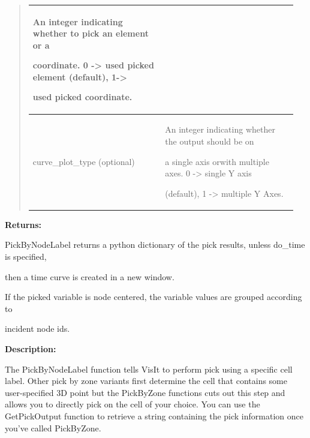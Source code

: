 \documentclass[letterpaper,10pt,english]{sphinxmanual}
\begin{document}
\begin{quote}
\begin{tabular}{|p{0.475\linewidth}|p{0.475\linewidth}|}
\begin{DUlineblock}{0em}
\item[] An integer indicating whether to pick an element or a
\item[] coordinate. 0 -\textgreater{} used picked element (default), 1-\textgreater{}
\item[] used picked coordinate.
\end{DUlineblock}
\\
\hline
curve\_plot\_type (optional)
 & 
\begin{DUlineblock}{0em}
\item[] An integer indicating whether the output should be on
\item[] a single axis orwith multiple axes. 0 -\textgreater{} single Y axis
\item[] (default), 1 -\textgreater{} multiple Y Axes.
\end{DUlineblock}
\\
\hline\end{tabular}

\end{quote}

\begin{DUlineblock}{0em}
\item[] 
\item[] \textbf{Returns:}
\item[] PickByNodeLabel returns a python dictionary of the pick results, unless do\_time is specified,
\item[] then a time curve is created in a new window.
\item[] If the picked variable is node centered, the variable values are grouped according to
\item[] incident node ids.
\item[] 
\item[] \textbf{Description:}
\item[] The PickByNodeLabel function tells VisIt to perform pick using a specific cell
label. Other pick by zone variants first determine the
cell that contains some user-specified 3D point but the PickByZone
functions cuts out this step and allows you to directly pick on the cell of
your choice. You can use the GetPickOutput function to retrieve a string
containing the pick information once you've called PickByZone.
\end{DUlineblock}

\begin{DUlineblock}{0em}
\item[] 
\end{DUlineblock}
\end{document}

